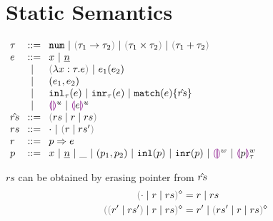 \section{Static Semantics}
$\arraycolsep=4pt\begin{array}{lll}
\tau & ::= &
  \tnum ~\vert~
  \tarr{\tau_1}{\tau_2} ~\vert~
  \tprod{\tau_1}{\tau_2} ~\vert~
  \tsum{\tau_1}{\tau_2} \\
e & ::= &
  x ~\vert~
  \hnum{n} \\
  & ~\vert~ &
  \hlam{x}{\tau}{e} ~\vert~
  \hap{e_1}{e_2} \\
  & ~\vert~ &
  \hpair{e_1}{e_2} \\
  & ~\vert~ &
  \hinl{\tau}{e} ~\vert~
  \hinr{\tau}{e} ~\vert~
  \hmatch{e}{\hat{rs}} \\
  & ~\vert~ &
  \hehole{u} ~\vert~
  \hhole{e}{u} \\
\hat{rs} & ::= &
  \inparens{\zruls{rs}{r}{rs}} \\
rs & ::= &
  \cdot ~\vert~ \hrulesP{r}{rs'} \\
r & ::= &
  \hrul{p}{e} \\
p & ::= &
  x ~\vert~
  \hnum{n} ~\vert~
  \_ ~\vert~
  \hpair{p_1}{p_2} ~\vert~
  \hinlp{p} ~\vert~
  \hinrp{p} ~\vert~
  \heholep{w} ~\vert~
  \hholep{p}{w}{\tau}
\end{array}$

        {$rs$ can be obtained by erasing pointer from $\hat{rs}$}
\begin{subequations}\label{defn:rmpointer}
\begin{align}
  \rmpointer{\zruls{\cdot}{r}{rs}} &= \hrules{r}{rs} \\
  \rmpointer{\zruls{\hrulesP{r'}{rs'}}{r}{rs}} &= \hrules{r'}{\rmpointer{\zruls{rs'}{r}{rs}}}
\end{align}
\end{subequations}

